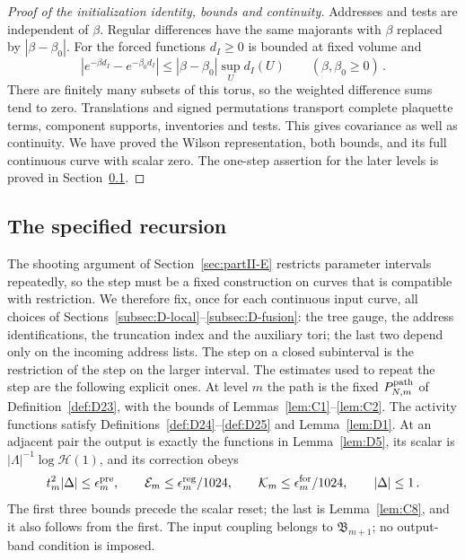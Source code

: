 \begin{proof}[Proof of the initialization identity, bounds and continuity]
Addresses and tests are independent of $\beta$. Regular differences have the same majorants with $\beta$ replaced by $|\beta-\beta_0|$. For the forced functions $d_I\ge0$ is bounded at fixed volume and
\begin{equation*}
|e^{-\beta d_I}-e^{-\beta_0d_I}|
\le|\beta-\beta_0|\sup_Ud_I(U)\qquad(\beta,\beta_0\ge0)\,.
\end{equation*}
There are finitely many subsets of this torus, so the weighted difference sums tend to zero. Translations and signed permutations transport complete plaquette terms, component supports, inventories and tests. This gives covariance as well as continuity. We have proved the Wilson representation, both bounds, and its full continuous curve with scalar zero. The one-step assertion for the later levels is proved in Section~\ref{subsec:D-recursion}.
\end{proof}

\subsection{The specified recursion}\label{subsec:D-recursion}

The shooting argument of Section~\ref{sec:partII-E} restricts parameter intervals repeatedly, so the step must be a fixed construction on curves that is compatible with restriction. We therefore fix, once for each continuous input curve, all choices of Sections~\ref{subsec:D-local}--\ref{subsec:D-fusion}: the tree gauge, the address identifications, the truncation index and the auxiliary tori; the last two depend only on the incoming address lists. The step on a closed subinterval is the restriction of the step on the larger interval. The estimates used to repeat the step are the following explicit ones. At level $m$ the path is the fixed $P^{\mathrm{path}}_{N,m}$ of Definition~\ref{def:D23}, with the bounds of Lemmas~\ref{lem:C1}--\ref{lem:C2}. The activity functions satisfy Definitions~\ref{def:D24}--\ref{def:D25} and Lemma~\ref{lem:D1}. At an adjacent pair the output is exactly the functions in Lemma~\ref{lem:D5}, its scalar is $|\Lambda|^{-1}\log\mathcal H(1)$, and its correction obeys
\begin{equation}\label{eq:D-retained}
t_m^2|\Delta|\le \epsilon^{\rm pre}_m,\qquad
\mathcal E_m\le\epsilon_m^{\rm reg}/1024,\qquad
\mathcal K_m\le\epsilon_m^{\rm for}/1024,\qquad
|\Delta|\le1\,.
\end{equation}
The first three bounds precede the scalar reset; the last is Lemma~\ref{lem:C8}, and it also follows from the first. The input coupling belongs to $\mathfrak B_{m+1}$; no output-band condition is imposed.

